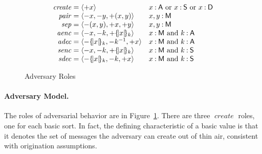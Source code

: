 \documentclass[12pt]{article}
\newcommand{\fn}[1]{\ensuremath{\operatorname{\mathit{#1}}}}
\newcommand{\seq}[1]{\ensuremath{\langle#1\rangle}}
\newcommand{\enc}[2]{\ensuremath{\{\!|#1|\!\}_{#2}}}
\newcommand{\invk}[1]{{#1}^{-1}}
\newcommand{\inbnd}{\mathord -}
\newcommand{\outbnd}{\mathord +}
\newcommand{\typ}{\mathbin:}
\newcommand{\srt}[1]{\ensuremath{\mathsf{#1}}}
\newcommand{\atom}{basic value}
\newcommand{\indefart}{a}
\begin{document}
\begin{figure}
  $$\begin{array}{r@{{}={}}ll}
    \fn{create}&\seq{\outbnd x}&
    \mbox{$x\typ\srt{A}$ or $x\typ\srt{S}$ or $x\typ\srt{D}$}\\
    \fn{pair}&
    \seq{\inbnd x,\inbnd y,\outbnd (x,y)}&
    x,y\typ\srt{M}\\
    \fn{sep}&
    \seq{\inbnd (x,y),\outbnd x,\outbnd y}&
    x,y\typ\srt{M}\\
    \fn{aenc}&
    \seq{\inbnd x,\inbnd k,\outbnd \enc{x}{k}}&
    \mbox{$x\typ\srt{M}$ and $k\typ\srt{A}$}\\
    \fn{adec}&
    \seq{\inbnd \enc{x}{k},\inbnd\invk{k},\outbnd x}&
    \mbox{$x\typ\srt{M}$ and $k\typ\srt{A}$}\\
    \fn{senc}&
    \seq{\inbnd x,\inbnd k,\outbnd \enc{x}{k}}&
    \mbox{$x\typ\srt{M}$ and $k\typ\srt{S}$}\\
    \fn{sdec}&
    \seq{\inbnd \enc{x}{k},\inbnd k,\outbnd x}&
    \mbox{$x\typ\srt{M}$ and $k\typ\srt{S}$}
  \end{array}$$
  \caption{Adversary Roles}\label{fig:adversary}
\end{figure}

\paragraph{Adversary Model.}
The roles of adversarial behavior are in Figure~\ref{fig:adversary}.
There are three \fn{create} roles, one for each basic sort.  In fact,
the defining characteristic of {\indefart} {\atom} is that it denotes
the set of messages the adversary can create out of thin air,
consistent with origination assumptions.
\end{document}
